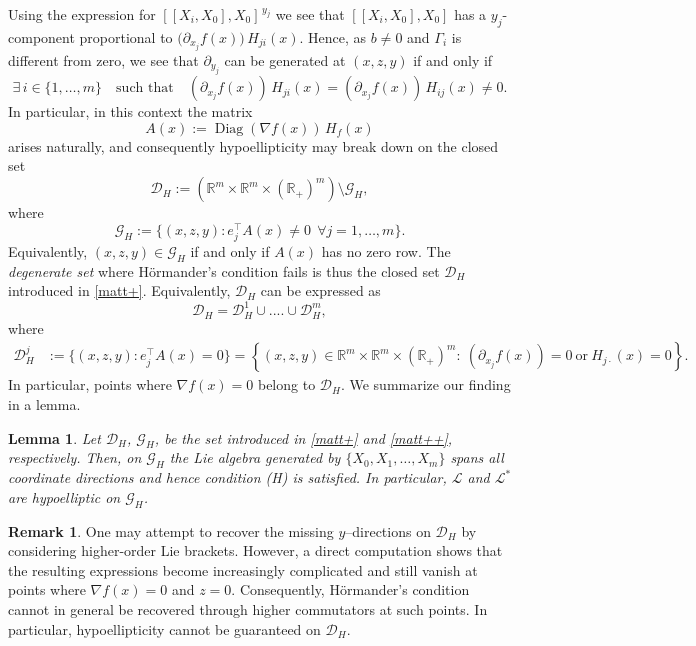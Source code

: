 \documentclass[11pt, a4paper,leqno]{amsart}
\newcommand{\Diag}{\operatorname{Diag}}
\newtheorem{lemma}{Lemma}[section]
\theoremstyle{definition}
\newtheorem{remark}{Remark}[section]
\numberwithin{equation}{section}
\newcommand{\R}{\mathbb R}
\begin{document}
\medskip
\noindent
Using the expression for $[[X_i,X_0],X_0]^{\,y_j}$ we see that $[[X_i,X_0],X_0]$ has a $y_j$-component proportional to
$\big(\partial_{x_j} f(x)\big)\,H_{j i}(x)$. Hence, as $b\neq 0$ and $\Gamma_i$ is different from zero, we see that $\partial_{y_j}$ can be generated at $(x,z,y)$ if and only if
\[
\exists\, i\in\{1,\dots,m\} \quad \text{such that} \quad
(\partial_{x_j} f(x))\,H_{ji}(x)=(\partial_{x_j} f(x))\,H_{ij}(x) \neq 0.
\]
In particular, in this context the matrix
\begin{equation}\label{matt}
A(x):=\Diag(\nabla f(x))\,H_f(x)
\end{equation}
arises naturally, and consequently hypoellipticity may break down on the closed set
\begin{equation}\label{matt+}
\mathcal{D}_H:=(\R^m\times\R^m\times(\R_+)^m)\setminus\mathcal{G}_H,
\end{equation}
where
\begin{equation}\label{matt++}
\mathcal{G}_H := \{(x,z,y): e_j^\top A(x)\neq 0 \ \ \forall j=1,\dots,m\}.
\end{equation}
Equivalently, $(x,z,y)\in\mathcal{G}_H$ if and only if $A(x)$ has no zero row. The \emph{degenerate set} where Hörmander’s condition  fails is thus the closed set $\mathcal{D}_H$ introduced in \eqref{matt+}. Equivalently,  $\mathcal{D}_H$ can be expressed as
$$\mathcal{D}_H=\mathcal{D}_H^1\cup ....\cup\mathcal{D}_H^m,$$
where
\begin{align}\label{hypc}
\mathcal{D}_H^j
&:=  \{(x,z,y): e_j^\top A(x)=0\}= \left\{(x,z,y) \in \mathbb{R}^m\times\mathbb{R}^m\times(\mathbb{R}_+)^m:
 \ (\partial_{x_j} f(x)) = 0 \ \text{or} \ H_{j\cdot}(x) = 0
\right\}.
\end{align}
In particular, points where $\nabla f(x)=0$ belong to $\mathcal{D}_H$. We summarize our finding in a lemma.

\begin{lemma}\label{lemmahyp} Let $\mathcal{D}_H$, $\mathcal{G}_H$, be the set introduced in \eqref{matt+} and \eqref{matt++}, respectively. Then, on  $\mathcal{G}_H$ the Lie algebra generated by $\{X_0,X_1,\dots,X_m\}$ spans all coordinate
directions and hence condition (H) is satisfied. In particular,  ${\mathcal{L}}$ and ${\mathcal{L}}^{\!*}$ are hypoelliptic on $\mathcal{G}_H$.
\end{lemma}




\begin{remark}
One may attempt to recover the missing $y$–directions on $\mathcal D_H$
by considering higher-order Lie brackets. However, a direct computation
shows that the resulting expressions become increasingly complicated
and still vanish at points where $\nabla f(x)=0$ and $z=0$.
Consequently, Hörmander's condition cannot in general be recovered
through higher commutators at such points. In particular,
hypoellipticity cannot be guaranteed on $\mathcal D_H$.
\end{remark}
\end{document}
